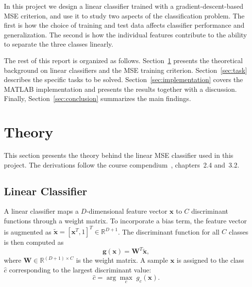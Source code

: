 \documentclass[11pt,a4paper]{article}
\begin{document}
In this project we design a linear classifier trained with a gradient-descent-based MSE criterion, and use it to study two aspects of the classification problem. The first is how the choice of training and test data affects classifier performance and generalization. The second is how the individual features contribute to the ability to separate the three classes linearly.

The rest of this report is organized as follows. Section~\ref{sec:theory} presents the theoretical background on linear classifiers and the MSE training criterion. Section~\ref{sec:task} describes the specific tasks to be solved. Section~\ref{sec:implementation} covers the MATLAB implementation and presents the results together with a discussion. Finally, Section~\ref{sec:conclusion} summarizes the main findings.

\section{Theory}
\label{sec:theory}

This section presents the theory behind the linear MSE classifier used in this project. The derivations follow the course compendium~\cite{compendium}, chapters~2.4 and~3.2.

\subsection{Linear Classifier}

A linear classifier maps a $D$-dimensional feature vector $\mathbf{x}$ to $C$ discriminant functions through a weight matrix. To incorporate a bias term, the feature vector is augmented as $\tilde{\mathbf{x}} = [\mathbf{x}^T, 1]^T \in \mathbb{R}^{D+1}$. The discriminant function for all $C$ classes is then computed as
\begin{equation}
    \mathbf{g}(\mathbf{x}) = \mathbf{W}^T \tilde{\mathbf{x}},
    \label{eq:discriminant}
\end{equation}
where $\mathbf{W} \in \mathbb{R}^{(D+1) \times C}$ is the weight matrix. A sample $\mathbf{x}$ is assigned to the class $\hat{c}$ corresponding to the largest discriminant value:
\begin{equation}
    \hat{c} = \arg\max_{c} \; g_c(\mathbf{x}).
    \label{eq:classification}
\end{equation}
\end{document}
